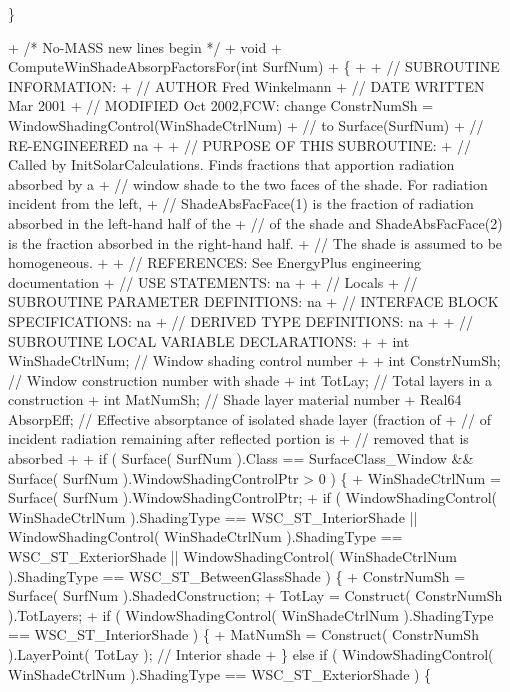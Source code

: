 \begin{DoxyCode}
    \}

+   /* No-MASS new lines begin */
+   void
+   ComputeWinShadeAbsorpFactorsFor(int SurfNum)
+   \{
+
+       // SUBROUTINE INFORMATION:
+       //       AUTHOR         Fred Winkelmann
+       //       DATE WRITTEN   Mar 2001
+       //       MODIFIED       Oct 2002,FCW: change ConstrNumSh =
       WindowShadingControl(WinShadeCtrlNum)%
+       //                      to Surface(SurfNum)%
+       //       RE-ENGINEERED  na
+
+       // PURPOSE OF THIS SUBROUTINE:
+       // Called by InitSolarCalculations. Finds fractions that apportion radiation absorbed by a
+       // window shade to the two faces of the shade. For radiation incident from the left,
+       // ShadeAbsFacFace(1) is the fraction of radiation absorbed in the left-hand half of the
+       // of the shade and ShadeAbsFacFace(2) is the fraction absorbed in the right-hand half.
+       // The shade is assumed to be homogeneous.
+
+       // REFERENCES: See EnergyPlus engineering documentation
+       // USE STATEMENTS: na
+
+       // Locals
+       // SUBROUTINE PARAMETER DEFINITIONS: na
+       // INTERFACE BLOCK SPECIFICATIONS: na
+       // DERIVED TYPE DEFINITIONS: na
+
+       // SUBROUTINE LOCAL VARIABLE DECLARATIONS:
+
+       int WinShadeCtrlNum; // Window shading control number
+
+       int ConstrNumSh; // Window construction number with shade
+       int TotLay; // Total layers in a construction
+       int MatNumSh; // Shade layer material number
+       Real64 AbsorpEff; // Effective absorptance of isolated shade layer (fraction of
+       //  of incident radiation remaining after reflected portion is
+       //  removed that is absorbed
+
+       if ( Surface( SurfNum ).Class == SurfaceClass\_Window && Surface( SurfNum ).WindowShadingControlPtr
       > 0 ) \{
+           WinShadeCtrlNum = Surface( SurfNum ).WindowShadingControlPtr;
+           if ( WindowShadingControl( WinShadeCtrlNum ).ShadingType == WSC\_ST\_InteriorShade ||
       WindowShadingControl( WinShadeCtrlNum ).ShadingType == WSC\_ST\_ExteriorShade || WindowShadingControl( WinShadeCtrlNum
       ).ShadingType == WSC\_ST\_BetweenGlassShade ) \{
+               ConstrNumSh = Surface( SurfNum ).ShadedConstruction;
+               TotLay = Construct( ConstrNumSh ).TotLayers;
+               if ( WindowShadingControl( WinShadeCtrlNum ).ShadingType == WSC\_ST\_InteriorShade ) \{
+                   MatNumSh = Construct( ConstrNumSh ).LayerPoint( TotLay ); // Interior shade
+               \} else if ( WindowShadingControl( WinShadeCtrlNum ).ShadingType == WSC\_ST\_ExteriorShade ) \{

\end{DoxyCode}

